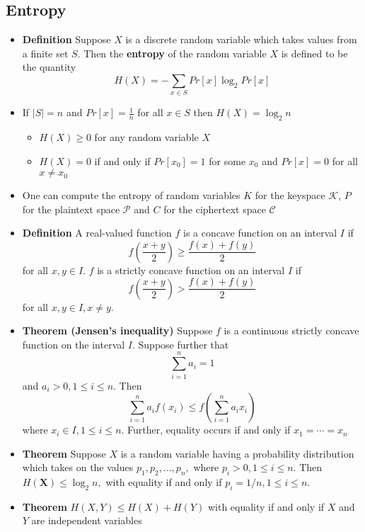 \subsection{Entropy}
\begin{itemize}
  \item \textbf{Definition} Suppose $X$ is a discrete random variable which takes values from a finite set $S$. Then the \textbf{entropy} of the random variable $X$ is defined to be the quantity
  \begin{equation*}
    H(X) = -\sum_{x \in S} Pr [x] \log_2 Pr[x]
  \end{equation*}
  \item If $|S| =n$ and $Pr[x] = \frac{1}{n}$ for all $x \in S$ then $H(X) = \log_2 n$
  \begin{itemize}
	  \item $H(X) \geq 0$ for any random variable $X$
  	\item $H(X)=0$ if and only if $Pr[x_0]= 1$ for some $x_0$ and $Pr[x] = 0$ for all $x \neq x_0$
  \end{itemize}
  \item One can compute the entropy of random variables $K$ for the keyspace $\mathcal K$, $P$ for the plaintext space $\mathcal P$ and $C$ for the ciphertext space $\mathcal C$
  \item \textbf{Definition} A real-valued function $f$ is a concave function on an interval $I$ if
  \[
    f\left(\frac{x+y}{2}\right) \geq \frac{f(x)+f(y)}{2}
  \]
  for all $x, y \in I$. $f$ is a strictly concave function on an interval $I$ if
  \[
    f\left(\frac{x+y}{2}\right)>\frac{f(x)+f(y)}{2}
  \]
  for all $x, y \in I, x \neq y .$
  \item \textbf{Theorem (Jensen's inequality)} Suppose $f$ is a continuous strictly concave function on the interval $I$. Suppose further that
  $$
    \sum_{i=1}^{n} a_{i}=1
  $$
  and $a_{i}>0,1 \leq i \leq n$. Then
  $$
    \sum_{i=1}^{n} a_{i} f\left(x_{i}\right) \leq f\left(\sum_{i=1}^{n} a_{i} x_{i}\right)
  $$
  where $x_{i} \in I, 1 \leq i \leq n .$ Further, equality occurs if and only if $x_{1}=\cdots=x_{n}$
  \item \textbf{Theorem} Suppose $X$ is a random variable having a probability distribution which takes on the values $p_{1}, p_{2}, \ldots, p_{n},$ where $p_{i}>0,1 \leq i \leq n$. Then $H(\mathbf{X}) \leq \log _{2} n,$ with equality if and only if $p_{i}=1 / n, 1 \leq i \leq n$.
  \item \textbf{Theorem} $H(X,Y) \leq H(X) + H(Y)$ with equality if and only if $X$ and $Y$ are independent variables

\end{itemize}
